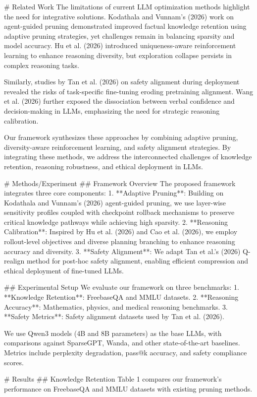 # Related Work  
The limitations of current LLM optimization methods highlight the need for integrative solutions. Kodathala and Vunnam's (2026) work on agent-guided pruning demonstrated improved factual knowledge retention using adaptive pruning strategies, yet challenges remain in balancing sparsity and model accuracy. Hu et al. (2026) introduced uniqueness-aware reinforcement learning to enhance reasoning diversity, but exploration collapse persists in complex reasoning tasks.

Similarly, studies by Tan et al. (2026) on safety alignment during deployment revealed the risks of task-specific fine-tuning eroding pretraining alignment. Wang et al. (2026) further exposed the dissociation between verbal confidence and decision-making in LLMs, emphasizing the need for strategic reasoning calibration.

Our framework synthesizes these approaches by combining adaptive pruning, diversity-aware reinforcement learning, and safety alignment strategies. By integrating these methods, we address the interconnected challenges of knowledge retention, reasoning robustness, and ethical deployment in LLMs.

# Methods/Experiment  
## Framework Overview  
The proposed framework integrates three core components:  
1. **Adaptive Pruning**: Building on Kodathala and Vunnam's (2026) agent-guided pruning, we use layer-wise sensitivity profiles coupled with checkpoint rollback mechanisms to preserve critical knowledge pathways while achieving high sparsity.  
2. **Reasoning Calibration**: Inspired by Hu et al. (2026) and Cao et al. (2026), we employ rollout-level objectives and diverse planning branching to enhance reasoning accuracy and diversity.  
3. **Safety Alignment**: We adapt Tan et al.'s (2026) Q-realign method for post-hoc safety alignment, enabling efficient compression and ethical deployment of fine-tuned LLMs.

## Experimental Setup  
We evaluate our framework on three benchmarks:  
1. **Knowledge Retention**: FreebaseQA and MMLU datasets.  
2. **Reasoning Accuracy**: Mathematics, physics, and medical reasoning benchmarks.  
3. **Safety Metrics**: Safety alignment datasets used by Tan et al. (2026).  

We use Qwen3 models (4B and 8B parameters) as the base LLMs, with comparisons against SparseGPT, Wanda, and other state-of-the-art baselines. Metrics include perplexity degradation, pass@k accuracy, and safety compliance scores.

# Results  
## Knowledge Retention  
Table 1 compares our framework's performance on FreebaseQA and MMLU datasets with existing pruning methods.  


